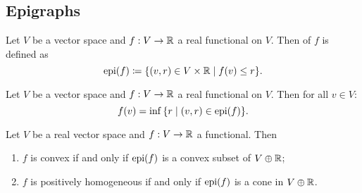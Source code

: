 \subsection{Epigraphs}
\begin{definition}
Let $V$ be a vector space and $f: V\to \mathbb{R}$ a real functional on $V$. Then  of $f$ is defined as
\[ \epigraph(f) \defeq \setbuilder{(v,r)\in V\times \R}{f(v)\leq r}. \]
\end{definition}

\begin{lemma} \label{epigraphLemma}
Let $V$ be a vector space and $f: V\to \mathbb{R}$ a real functional on $V$. Then for all $v\in V$:
\[ f(v) = \inf\setbuilder{r}{(v,r)\in \epigraph(f)}. \]
\end{lemma}

\begin{proposition} \label{epigraphProperties}
Let $V$ be a real vector space and $f: V\to \mathbb{R}$ a functional. Then
\begin{enumerate}
\item $f$ is convex \textup{if and only if} $\operatorname{epi}(f)$ is a convex subset of $V\oplus \mathbb{R}$;
\item $f$ is positively homogeneous \textup{if and only if} $\operatorname{epi}(f)$ is a cone in $V\oplus \mathbb{R}$.
\end{enumerate}
\end{proposition}
